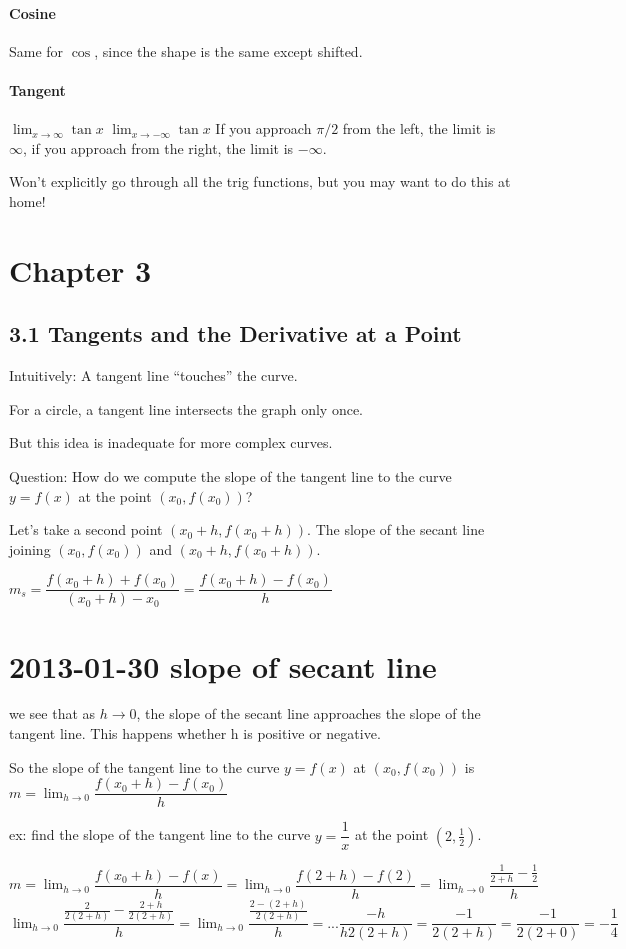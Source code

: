 \documentclass[12pt]{article}
\begin{document}
\paragraph{Cosine}
Same for $\cos$, since the shape is the same except shifted.
\paragraph{Tangent}
$\lim_{x\to\infty}\tan x$
$\lim_{x\to-\infty}\tan x$
If you approach $\pi/2$ from the left, the limit is $\infty$, if you approach from the right, the limit is
$-\infty$. 


Won't explicitly go through all the trig functions, but you may want to do this at home!
\section{Chapter 3}
\subsection{3.1 Tangents and the Derivative at a Point}

Intuitively: A tangent line ``touches'' the curve.

For a circle, a tangent line intersects the graph only once.

But this idea is inadequate for more complex curves.

Question: How do we compute the slope of the tangent line to the curve $y=f(x)$ at the point $(x_0,f(x_0))$?


Let's take a second point $(x_0+h,f(x_0+h))$. The slope of the secant line joining $(x_0,f(x_0))$ and
$(x_0+h,f(x_0+h))$.

$m_s = \dfrac{f(x_0+h)+f(x_0)}{(x_0+h)-x_0} = \dfrac{f(x_0+h)-f(x_0)}{h}$

\section{2013-01-30 slope of secant line}
we see that as $h \to 0$, the slope of the secant line approaches the slope of the tangent line.
This happens whether h is positive or negative.

So the slope of the tangent line to the curve $y=f(x)$ at $(x_{0},f(x_{0}))$ is $m=\lim_{h\to0}\dfrac{f(x_{0}+h)-f(x_{0})}{h}$


ex: find the slope of the tangent line to the curve $y=\dfrac{1}{x}$ at the point $(2,\frac{1}{2})$.

$m = \lim_{h\to0}\dfrac{f(x_{0}+h)-f(x)}{h} = \lim_{h\to0}\dfrac{f(2+h)-f(2)}{h} =
\lim_{h\to0}\dfrac{\frac{1}{2+h}-\frac{1}{2}}{h}$
$\lim_{h\to0}\dfrac{\frac{2}{2(2+h)} - \frac{2+h}{2(2+h)}}{h} = \lim_{h\to0}\dfrac{\frac{2-(2+h)}{2(2+h)}}{h}
= ... \dfrac{-h}{h2(2+h)} = \dfrac{-1}{2(2+h)} = \dfrac{-1}{2(2+0)} = -\dfrac{1}{4}$
\end{document}
